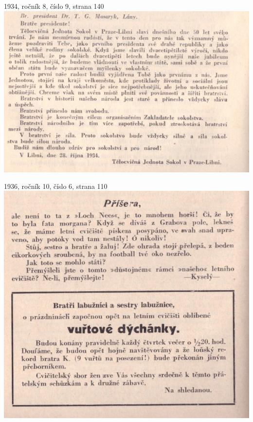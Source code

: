 \documentclass[11pt]{article}
\begin{document}
\vspace*{\baselineskip}
1934, ročník 8, číslo 9, strana 140 \\
\includegraphics[width=\imagewidth]{original/1934/Skener_20250325 (16).jpg}




1936, ročník 10, číslo 6, strana 110 \\
\includegraphics[width=\imagewidth]{original/1936/Skener_20250323 (2).jpg}
\end{document}
